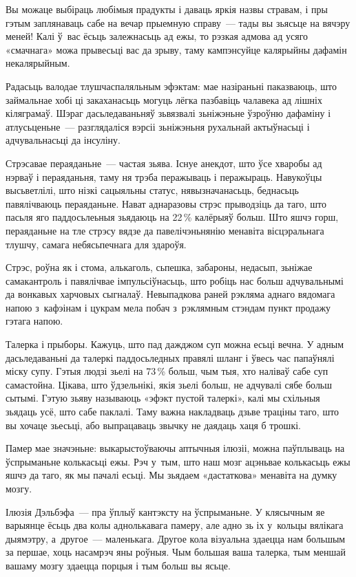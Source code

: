 Вы можаце выбіраць любімыя прадукты і даваць яркія назвы стравам, і пры гэтым заплянаваць сабе на вечар прыемную справу~--- тады вы зьясьце на вячэру меней! Калі ў~вас ёсьць залежнасьць ад ежы, то рэзкая адмова ад усяго «смачнага» можа прывесьці вас да зрыву, таму кампэнсуйце калярыйны дафамін некалярыйным.

Радасьць валодае тлушчаспаляльным эфэктам: мае назіраньні паказваюць, што займальнае хобі ці закаханасьць могуць лёгка пазбавіць чалавека ад лішніх кіляграмаў. Шэраг дасьледаваньняў зьвязвалі зьніжэньне ўзроўню дафаміну і атлусьценьне~--- разглядаліся вэрсіі зьніжэньня рухальнай актыўнасьці і адчувальнасьці да інсуліну.

Стрэсавае пераяданьне~--- частая зьява. Існуе анекдот, што ўсе хваробы ад нэрваў і пераяданьня, таму ня трэба перажываць і перажыраць. Навукоўцы высьветлілі, што нізкі сацыяльны статус, нявызначанасьць, беднасьць павялічваюць пераяданьне. Нават аднаразовы стрэс прыводзіць да таго, што пасьля яго паддосьлеьныя зьядаюць на 22\,\% калёрыяў больш. Што яшчэ горш, пераяданьне на тле стрэсу вядзе да павелічэньнянію менавіта вісцэральнага тлушчу, самага небясьпечнага для здароўя.

Стрэс, роўна як і стома, алькаголь, сьпешка, забароны, недасып, зьніжае самакантроль і павялічвае імпульсіўнасьць, што робіць нас больш адчувальнымі да вонкавых харчовых сыгналаў. Невыпадкова раней рэкляма аднаго вядомага напою з~кафэінам і цукрам мела побач з~рэклямным стэндам пункт продажу гэтага напою.

Талерка і прыборы. Кажуць, што пад дажджом суп можна есьці вечна. У адным дасьледаваньні да талеркі паддосьледных правялі шланг і ўвесь час папаўнялі міску супу. Гэтыя людзі зьелі на 73\,\% больш, чым тыя, хто наліваў сабе суп самастойна. Цікава, што ўдзельнікі, якія зьелі больш, не адчувалі сябе больш сытымі. Гэтую зьяву называюць «эфэкт пустой талеркі», калі мы схільныя зьядаць усё, што сабе паклалі. Таму важна накладваць дзьве траціны таго, што вы хочаце зьесьці, або выпрацаваць звычку не даядаць хаця б трошкі.

Памер мае значэньне: выкарыстоўваючы аптычныя ілюзіі, можна паўплываць на ўспрыманьне колькасьці ежы. Рэч у~тым, што наш мозг ацэньвае колькасьць ежы яшчэ да таго, як мы пачалі есьці. Мы зьядаем «дастаткова» менавіта на думку мозгу.

Ілюзія Дэльбэфа~--- пра ўплыў кантэксту на ўспрыманьне. У клясычным яе варыянце ёсьць два колы аднолькавага памеру, але адно зь іх у~кольцы вялікага дыямэтру, а~другое~--- маленькага. Другое кола візуальна здаецца нам большым за першае, хоць насамрэч яны роўныя. Чым большая ваша талерка, тым меншай вашаму мозгу здаецца порцыя і тым больш вы ясьце.

